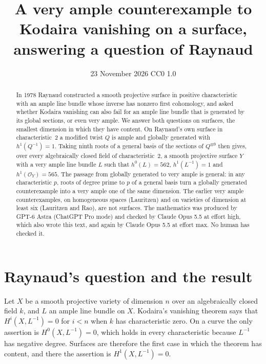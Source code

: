 \documentclass[11pt,a4paper]{article}
\title{A very ample counterexample to Kodaira vanishing on a surface,\\ answering a question of Raynaud}
\author{}
\date{23 November 2026 \quad CC0 1.0}
\theoremstyle{plain}
\theoremstyle{remark}
\newcommand{\OO}{\mathcal O}
\begin{document}
\maketitle

\begin{abstract}
\noindent
In 1978 Raynaud constructed a smooth projective surface in positive characteristic with an ample line bundle whose
inverse has nonzero first cohomology, and asked whether Kodaira vanishing can also fail for an ample line bundle that
is generated by its global sections, or even very ample. We answer both questions on surfaces, the smallest dimension
in which they have content. On Raynaud's own surface in characteristic~$2$ a modified twist $Q$ is ample and globally
generated with $h^1(Q^{-1})=1$. Taking ninth roots of a general basis of the sections of $Q^{\otimes 9}$ then gives,
over every algebraically closed field of characteristic~$2$, a smooth projective surface $Y$ with a very ample line
bundle $L$ such that $h^0(L)=562$, $h^1(L^{-1})=1$ and $h^1(\OO_Y)=565$. The passage from globally generated to very
ample is general: in any characteristic $p$, roots of degree prime to $p$ of a general basis turn a globally generated
counterexample into a very ample one of the same dimension. The earlier very ample counterexamples, on homogeneous
spaces (Lauritzen) and on varieties of dimension at least six (Lauritzen and Rao), are not surfaces. The mathematics was produced by GPT-6 Astra (ChatGPT Pro mode) and
checked by Claude Opus 5.5 at effort high, which also wrote this text, and again by Claude Opus 5.5 at effort max. No human
has checked it.
\end{abstract}

\section{Raynaud's question and the result}

Let $X$ be a smooth projective variety of dimension $n$ over an algebraically closed field $k$, and $L$ an ample line
bundle on $X$. Kodaira's vanishing theorem says that $H^i(X,L^{-1})=0$ for $i<n$ when $k$ has characteristic zero. On
a curve the only assertion is $H^0(X,L^{-1})=0$, which holds in every characteristic because $L^{-1}$ has negative
degree. Surfaces are therefore the first case in which the theorem has content, and there the assertion is
$H^1(X,L^{-1})=0$.
\end{document}
